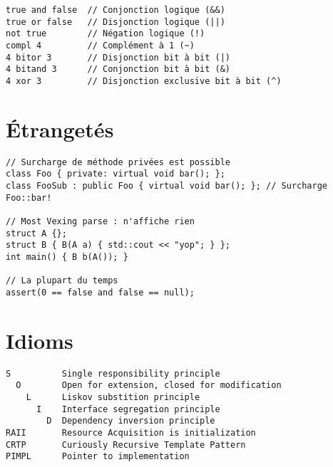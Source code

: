 \documentclass{article}
\begin{document}
\begin{multicols*}{3}
\begin{lstlisting}
true and false  // Conjonction logique (&&)
true or false   // Disjonction logique (||)
not true        // Négation logique (!)
compl 4         // Complément à 1 (~)
4 bitor 3       // Disjonction bit à bit (|)
4 bitand 3      // Conjonction bit à bit (&)
4 xor 3         // Disjonction exclusive bit à bit (^)
\end{lstlisting}

\section*{Étrangetés}

\begin{lstlisting}
// Surcharge de méthode privées est possible
class Foo { private: virtual void bar(); };
class FooSub : public Foo { virtual void bar(); }; // Surcharge Foo::bar!

// Most Vexing parse : n'affiche rien
struct A {};
struct B { B(A a) { std::cout << "yop"; } };
int main() { B b(A()); }

// La plupart du temps
assert(0 == false and false == null);
\end{lstlisting}

\section*{Idioms}
\begin{lstlisting}
S          Single responsibility principle
  O        Open for extension, closed for modification
    L      Liskov substition principle
      I    Interface segregation principle
        D  Dependency inversion principle
RAII       Resource Acquisition is initialization
CRTP       Curiously Recursive Template Pattern
PIMPL      Pointer to implementation
\end{lstlisting}

\end{multicols*}
\end{document}
